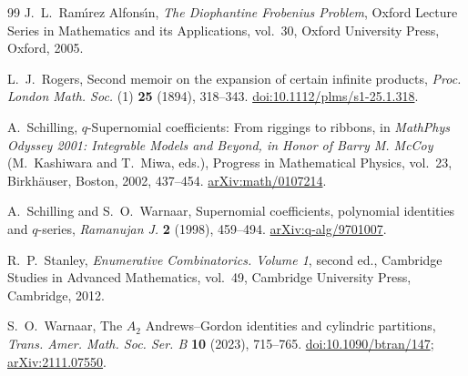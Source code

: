 \documentclass[12pt,reqno]{amsart}
\numberwithin{equation}{section}
\theoremstyle{definition}
\theoremstyle{remark}
\theoremstyle{plain}
\begin{document}
\begin{thebibliography}{99}
J.~L.~Ram\'{\i}rez Alfons\'{\i}n,
\emph{The Diophantine Frobenius Problem},
Oxford Lecture Series in Mathematics and its Applications, vol.~30,
Oxford University Press, Oxford, 2005.

L.~J.~Rogers,
Second memoir on the expansion of certain infinite products,
\emph{Proc. London Math. Soc.} (1) \textbf{25} (1894), 318--343.
\href{https://doi.org/10.1112/plms/s1-25.1.318}{doi:10.1112/plms/s1-25.1.318}.

A.~Schilling,
$q$-Supernomial coefficients: From riggings to ribbons,
in \emph{MathPhys Odyssey 2001: Integrable Models and Beyond, in Honor of Barry M. McCoy}
(M.~Kashiwara and T.~Miwa, eds.), Progress in Mathematical Physics, vol.~23,
Birkh\"auser, Boston, 2002, 437--454.
\href{https://arxiv.org/abs/math/0107214}{arXiv:math/0107214}.

A.~Schilling and S.~O.~Warnaar,
Supernomial coefficients, polynomial identities and $q$-series,
\emph{Ramanujan J.} \textbf{2} (1998), 459--494.
\href{https://arxiv.org/abs/q-alg/9701007}{arXiv:q-alg/9701007}.

R.~P.~Stanley,
\emph{Enumerative Combinatorics. Volume 1}, second ed.,
Cambridge Studies in Advanced Mathematics, vol.~49,
Cambridge University Press, Cambridge, 2012.

S.~O.~Warnaar,
The $A_2$ Andrews--Gordon identities and cylindric partitions,
\emph{Trans. Amer. Math. Soc. Ser. B} \textbf{10} (2023), 715--765.
\href{https://doi.org/10.1090/btran/147}{doi:10.1090/btran/147};
\href{https://arxiv.org/abs/2111.07550}{arXiv:2111.07550}.

\end{thebibliography}
\end{document}
